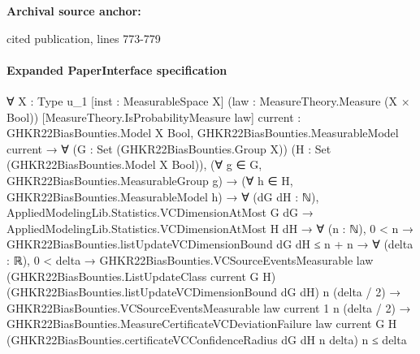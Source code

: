 \documentclass[10pt]{article}
\begin{document}
\textbf{Archival source anchor:} {\footnotesize\raggedright cited publication, lines 773-\allowbreak{}779\par}
\paragraph{Expanded PaperInterface specification}
\begin{ReviewVerbatim}
∀ {X : Type u_1} [inst : MeasurableSpace X] (law : MeasureTheory.Measure (X × Bool))
  [MeasureTheory.IsProbabilityMeasure law] {current : GHKR22BiasBounties.Model X Bool},
  GHKR22BiasBounties.MeasurableModel current →
    ∀ (G : Set (GHKR22BiasBounties.Group X)) (H : Set (GHKR22BiasBounties.Model X Bool)),
      (∀ g ∈ G, GHKR22BiasBounties.MeasurableGroup g) →
        (∀ h ∈ H, GHKR22BiasBounties.MeasurableModel h) →
          ∀ (dG dH : ℕ),
            AppliedModelingLib.Statistics.VCDimensionAtMost G dG →
              AppliedModelingLib.Statistics.VCDimensionAtMost H dH →
                ∀ (n : ℕ),
                  0 < n →
                    GHKR22BiasBounties.listUpdateVCDimensionBound dG dH ≤ n + n →
                      ∀ (delta : ℝ),
                        0 < delta →
                          GHKR22BiasBounties.VCSourceEventsMeasurable law
                              (GHKR22BiasBounties.ListUpdateClass current G H)
                              (GHKR22BiasBounties.listUpdateVCDimensionBound dG dH) n (delta / 2) →
                            GHKR22BiasBounties.VCSourceEventsMeasurable law {current} 1 n (delta / 2) →
                              GHKR22BiasBounties.MeasureCertificateVCDeviationFailure law current G H
                                  (GHKR22BiasBounties.certificateVCConfidenceRadius dG dH n delta) n ≤
                                delta
\end{ReviewVerbatim}
\end{document}
